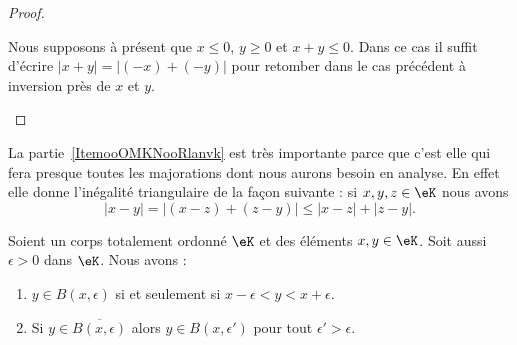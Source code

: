 \begin{proof}
\begin{subproof}
\begin{enumerate}
                    Nous supposons à présent que \( x\leq 0\), \( y\geq 0\) et \( x+y\leq 0\). Dans ce cas il suffit d'écrire \( | x+y |=| (-x)+(-y) |\) pour retomber dans le cas précédent à inversion près de \( x\) et \( y\).
            \end{enumerate}
    \end{subproof}
\end{proof}

\begin{remark}      \label{RemooJCAUooKkuglX}
    La partie~\ref{ItemooOMKNooRlanvk} est très importante parce que c'est elle qui fera presque toutes les majorations dont nous aurons besoin en analyse. En effet elle donne l'inégalité triangulaire de la façon suivante : si \( x,y,z\in \eK\) nous avons
    \begin{equation}
        | x-y |= |  (x-z)+(z-y) |\leq | x-z |+| z-y |.
    \end{equation}
\end{remark}

\begin{lemma}
    Soient un corps totalement ordonné \( \eK\) et des éléments \( x,y\in \eK\). Soit aussi \( \epsilon>0\) dans \( \eK\). Nous avons :
    \begin{enumerate}
        \item       \label{ITEMooXJGVooSebiip}
            \( y\in B(x,\epsilon)\) si et seulement si \( x-\epsilon<y<x+\epsilon\).
        \item       \label{ITEMooRUBBooRayiMs}
            Si \( y\in  \overline{ B(x,\epsilon) }  \) alors \( y\in B(x,\epsilon')\) pour tout \( \epsilon'>\epsilon\).
    \end{enumerate}
\end{lemma}

